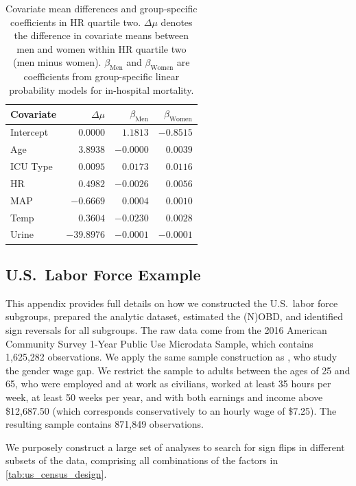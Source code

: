 \begin{table}[!ht]
    \caption{Covariate mean differences and group-specific coefficients in HR quartile two. $\Delta\mu$ denotes the difference in covariate means between men and women within HR quartile two (men minus women). $\beta_{\text{Men}}$ and $\beta_{\text{Women}}$ are coefficients from group-specific linear probability models for in-hospital mortality.}
    \label{tab:delta_mu_betas}
    \centering
    \small
    \begin{tabular}{lrrr}
    \toprule
    Covariate 
    & $\Delta\mu$ 
    & $\beta_{\text{Men}}$ 
    & $\beta_{\text{Women}}$ \\
    \midrule
    Intercept & $0.0000$   & $1.1813$  & $-0.8515$ \\
    Age       & $3.8938$   & $-0.0000$ & $0.0039$ \\
    ICU Type  & $0.0095$   & $0.0173$  & $0.0116$ \\
    HR        & $0.4982$   & $-0.0026$ & $0.0056$ \\
    MAP       & $-0.6669$  & $0.0004$  & $0.0010$ \\
    Temp      & $0.3604$   & $-0.0230$ & $0.0028$ \\
    Urine     & $-39.8976$ & $-0.0001$ & $-0.0001$ \\
    \bottomrule
    \end{tabular}
\end{table}
    
\subsection{U.S.\ Labor Force Example}
\label{appendix:us_labor_force}
This appendix provides full details on how we constructed the U.S.\ labor force subgroups, prepared the analytic dataset, estimated the (N)OBD, and identified sign reversals for all subgroups. 
The raw data come from the 2016 American Community Survey 1-Year Public Use Microdata Sample, which contains 1,625,282 observations.
We apply the same sample construction as \citet{bach2024heterogeneity}, who study the gender wage gap.
We restrict the sample to adults between the ages of 25 and 65, who were employed and at work as civilians, worked at least 35 hours per week, at least 50 weeks per year, and with both earnings and income above \$12,687.50 (which corresponds conservatively to an hourly wage of \$7.25).
The resulting sample contains 871,849 observations.

We purposely construct a large set of analyses to search for sign flips in different subsets of the data, comprising all combinations of the factors in \cref{tab:us_census_design}.

